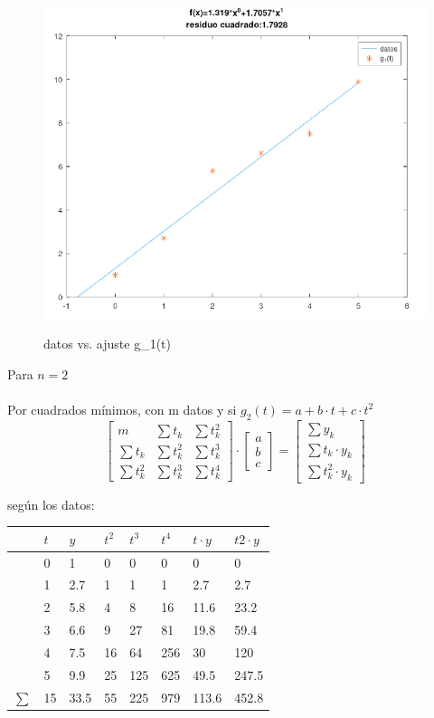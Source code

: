 \documentclass{article}
\begin{document}
\begin{figure}[H]
    \centering
    \includegraphics[width=0.6\linewidth]{grado.1.png}
    \label{fig:enter-label}
    \caption{datos vs. ajuste g_1(t)}
\end{figure}

Para $n=2$\\\\
Por cuadrados mínimos, con m datos y si 
$g_2(t)=a + b \cdot t + c \cdot t^2$
\[
\begin{bmatrix}
    m & \sum{t_k} & \sum{t_k^2} \\
    \sum{t_k} & \sum{t_k^2} & \sum{t_k^3}\\
    \sum{t_k^2} & \sum{t_k^3} & \sum{t_k^4}
\end{bmatrix}
\cdot
\begin{bmatrix}
    a \\ b \\ c
\end{bmatrix}
=
\begin{bmatrix}
    \sum{y_k} \\
    \sum{t_k \cdot y_k}\\
     \sum{t_k^2 \cdot y_k}
\end{bmatrix}
\]

según los datos:

\begin{table}[H]
\centering
\begin{tabular}{|l|l|l|l|l|l|l|l|}
\hline
  & $t$  & $y$ & $t^2$ & $t^3$  & $t^4$   & $t \cdot y$   & $t2 \cdot y$  \\ \hline
  & 0  & 1    & 0  & 0   & 0    & 0     & 0     \\
  & 1  & 2.7  & 1  & 1   & 1    & 2.7   & 2.7   \\
  & 2  & 5.8  & 4  & 8   & 16   & 11.6  & 23.2  \\
  & 3  & 6.6  & 9  & 27  & 81   & 19.8  & 59.4  \\
  & 4  & 7.5  & 16 & 64  & 256  & 30    & 120   \\
  & 5  & 9.9  & 25 & 125 & 625  & 49.5  & 247.5 \\ \hline
$\sum$ & 15 & 33.5 & 55 & 225 & 979 & 113.6 & 452.8 \\ \hline
\end{tabular}
\end{table}
\end{document}
